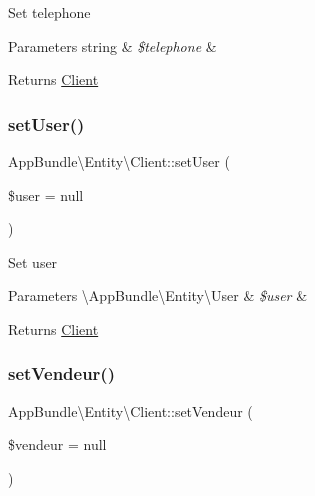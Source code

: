 Set telephone


\begin{DoxyParams}[1]{Parameters}
string & {\em \$telephone} & \\
\hline
\end{DoxyParams}
\begin{DoxyReturn}{Returns}
\hyperlink{class_app_bundle_1_1_entity_1_1_client}{Client} 
\end{DoxyReturn}
\mbox{\label{class_app_bundle_1_1_entity_1_1_client_aad97e5148a8c5099ca2ccc597db9e562}} 
\subsubsection{\texorpdfstring{set\+User()}{setUser()}}
{\footnotesize\ttfamily App\+Bundle\textbackslash{}\+Entity\textbackslash{}\+Client\+::set\+User (\begin{DoxyParamCaption}\item[{\textbackslash{}\hyperlink{class_app_bundle_1_1_entity_1_1_user}{App\+Bundle\textbackslash{}\+Entity\textbackslash{}\+User}}]{\$user = {\ttfamily null} }\end{DoxyParamCaption})}

Set user


\begin{DoxyParams}[1]{Parameters}
\textbackslash{}\+App\+Bundle\textbackslash{}\+Entity\textbackslash{}\+User & {\em \$user} & \\
\hline
\end{DoxyParams}
\begin{DoxyReturn}{Returns}
\hyperlink{class_app_bundle_1_1_entity_1_1_client}{Client} 
\end{DoxyReturn}
\mbox{\label{class_app_bundle_1_1_entity_1_1_client_a884be53721153a7adafe2dda81c22d8e}} 
\subsubsection{\texorpdfstring{set\+Vendeur()}{setVendeur()}}
{\footnotesize\ttfamily App\+Bundle\textbackslash{}\+Entity\textbackslash{}\+Client\+::set\+Vendeur (\begin{DoxyParamCaption}\item[{\textbackslash{}\hyperlink{class_app_bundle_1_1_entity_1_1_vendeur}{App\+Bundle\textbackslash{}\+Entity\textbackslash{}\+Vendeur}}]{\$vendeur = {\ttfamily null} }\end{DoxyParamCaption})}

